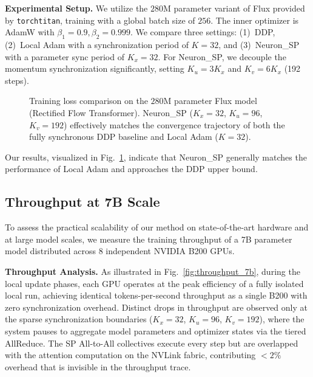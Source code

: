 \documentclass{article}
\begin{document}
\textbf{Experimental Setup.} We utilize the $280$M parameter variant of Flux provided by \texttt{torchtitan}, training with a global batch size of $256$. The inner optimizer is AdamW with $\beta_1=0.9, \beta_2=0.999$. We compare three settings: (1)~DDP, (2)~Local Adam with a synchronization period of $K=32$, and (3)~Neuron\_SP with a parameter sync period of $K_x=32$. For Neuron\_SP, we decouple the momentum synchronization significantly, setting $K_u=3K_x$ and $K_v=6K_x$ (192 steps).

\begin{figure}[t]
\centering
\caption{Training loss comparison on the $280$M parameter Flux model (Rectified Flow Transformer). Neuron\_SP ($K_x=32$, $K_u=96$, $K_v=192$) effectively matches the convergence trajectory of both the fully synchronous DDP baseline and Local Adam ($K=32$).}
\label{fig:flux}
\end{figure}

Our results, visualized in Fig.~\ref{fig:flux}, indicate that Neuron\_SP generally matches the performance of Local Adam and approaches the DDP upper bound.

\begin{center}\end{center}

\subsection{Throughput at 7B Scale}
\label{sec:b9_throughput}

To assess the practical scalability of our method on state-of-the-art hardware and at large model scales, we measure the training throughput of a 7B parameter model distributed across $8$ independent NVIDIA B200 GPUs.

\textbf{Throughput Analysis.} As illustrated in Fig.~\ref{fig:throughput_7b}, during the local update phases, each GPU operates at the peak efficiency of a fully isolated local run, achieving identical tokens-per-second throughput as a single B200 with zero synchronization overhead. Distinct drops in throughput are observed only at the sparse synchronization boundaries ($K_x=32$, $K_u=96$, $K_v=192$), where the system pauses to aggregate model parameters and optimizer states via the tiered AllReduce. The SP All-to-All collectives execute every step but are overlapped with the attention computation on the NVLink fabric, contributing $<2\%$ overhead that is invisible in the throughput trace.
\end{document}
